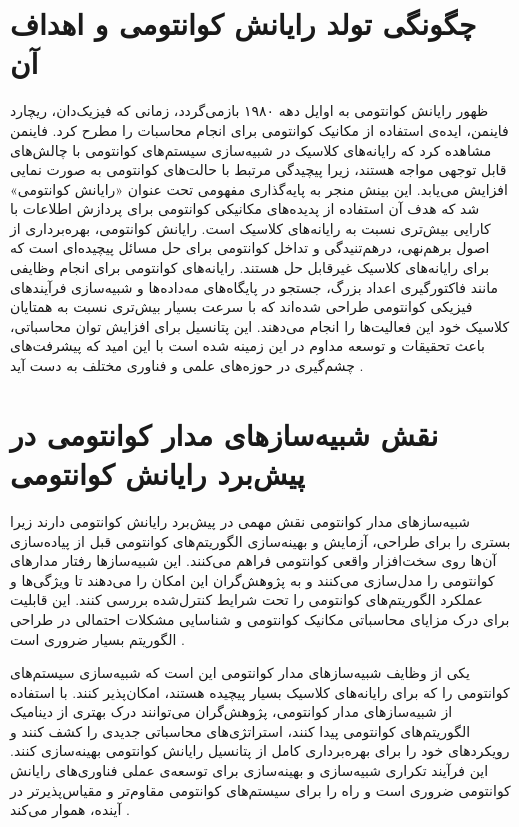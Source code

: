 \section{چگونگی تولد رایانش کوانتومی و اهداف آن}
ظهور رایانش کوانتومی به اوایل دهه ۱۹۸۰ بازمی‌گردد، زمانی که فیزیک‌دان، ریچارد فاینمن، ایده‌ی استفاده از مکانیک کوانتومی برای انجام محاسبات را مطرح کرد. فاینمن مشاهده کرد که رایانه‌های کلاسیک در شبیه‌سازی سیستم‌های کوانتومی با چالش‌های قابل توجهی مواجه هستند، زیرا پیچیدگی مرتبط با حالت‌های کوانتومی به صورت نمایی افزایش می‌یابد. این بینش منجر به پایه‌گذاری مفهومی تحت عنوان «رایانش کوانتومی» شد که هدف آن استفاده از پدیده‌های مکانیکی کوانتومی برای پردازش اطلاعات با کارایی بیش‌تری نسبت به رایانه‌های کلاسیک است. رایانش کوانتومی، بهره‌برداری از اصول برهم‌نهی، درهم‌تنیدگی و تداخل کوانتومی برای حل مسائل پیچیده‌ای است که برای رایانه‌های کلاسیک غیرقابل حل هستند. رایانه‌های کوانتومی برای انجام وظایفی مانند فاکتورگیری اعداد بزرگ، جستجو در پایگاه‌های مه‌داده‌ها و شبیه‌سازی فرآیندهای فیزیکی کوانتومی طراحی شده‌اند که با سرعت بسیار بیش‌تری نسبت به همتایان کلاسیک خود این فعالیت‌ها را انجام می‌دهند. این پتانسیل برای افزایش توان محاسباتی، باعث تحقیقات و توسعه مداوم در این زمینه شده است با این امید که پیشرفت‌های چشم‌گیری در حوزه‌های علمی و فناوری مختلف به دست آید \cite{nielsen_quantum_2010}.
\section{نقش شبیه‌سازهای مدار کوانتومی در پیش‌برد رایانش کوانتومی}
شبیه‌سازهای مدار کوانتومی نقش مهمی در پیش‌برد رایانش کوانتومی دارند زیرا بستری را برای طراحی، آزمایش و بهینه‌سازی الگوریتم‌های کوانتومی قبل از پیاده‌سازی آن‌ها روی سخت‌افزار واقعی کوانتومی فراهم می‌کنند. این شبیه‌سازها رفتار مدارهای کوانتومی را مدل‌سازی می‌کنند و به پژوهش‌گران این امکان را می‌دهند تا ویژگی‌ها و عملکرد الگوریتم‌های کوانتومی را تحت شرایط کنترل‌شده بررسی کنند. این قابلیت برای درک مزایای محاسباتی مکانیک کوانتومی و شناسایی مشکلات احتمالی در طراحی الگوریتم بسیار ضروری است \cite{nielsen_quantum_2010}.

یکی از وظایف شبیه‌سازهای مدار کوانتومی این است که شبیه‌سازی سیستم‌های کوانتومی را که برای رایانه‌های کلاسیک بسیار پیچیده هستند، امکان‌پذیر کنند. با استفاده از شبیه‌سازهای مدار کوانتومی، پژوهش‌گران می‌توانند درک بهتری از دینامیک الگوریتم‌های کوانتومی پیدا کنند، استراتژی‌های محاسباتی جدیدی را کشف کنند و رویکردهای خود را برای بهره‌برداری کامل از پتانسیل رایانش کوانتومی بهینه‌سازی کنند. این فرآیند تکراری شبیه‌سازی و بهینه‌سازی برای توسعه‌ی عملی فناوری‌های رایانش کوانتومی ضروری است و راه را برای سیستم‌های کوانتومی مقاوم‌تر و مقیاس‌پذیرتر در آینده، هموار می‌کند \cite{nielsen_quantum_2010}.
